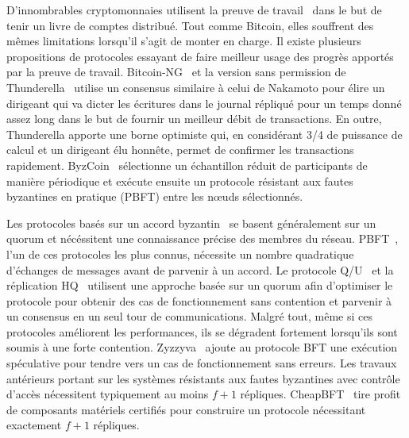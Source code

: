 {D'innombrables cryptomonnaies utilisent la preuve de travail~\cite{DworkN92, aspnes2005exposing} dans le but de tenir
un livre de comptes distribué. Tout comme Bitcoin, elles souffrent des mêmes limitations lorsqu'il s'agit de monter en
charge. Il existe plusieurs propositions de protocoles essayant de faire meilleur usage des progrès apportés par la
preuve de travail. Bitcoin-NG~\cite{EyalGSR16} et la version sans permission de Thunderella~\cite{PassS18} utilise
un consensus similaire à celui de Nakamoto pour élire un dirigeant qui va dicter les écritures dans le journal répliqué
pour un temps donné assez long dans le but de fournir un meilleur débit de transactions. En outre, Thunderella apporte
une borne optimiste qui, en considérant 3/4 de puissance de calcul et un dirigeant élu honnête, permet de confirmer les
transactions rapidement. ByzCoin~\cite{Kokoris-KogiasJ16} sélectionne un échantillon réduit de participants de manière
périodique et exécute ensuite un protocole résistant aux fautes byzantines en pratique (PBFT) entre les nœuds
sélectionnés.


Les protocoles basés sur un accord byzantin~\cite{PeaseSL80, LamportSP82} se basent généralement sur un quorum et
nécéssitent une connaissance précise des membres du réseau. PBFT~\cite{castro1999practical, CL02}, l'un de ces
protocoles les plus connus, nécessite un nombre quadratique d'échanges de messages avant de parvenir à un accord.
Le protocole Q/U~\cite{abd2005fault} et la réplication HQ~\cite{cowling2006hq} utilisent une approche basée sur un
quorum afin d'optimiser le protocole pour obtenir des cas de fonctionnement sans contention et parvenir à un consensus
en un seul tour de communications. Malgré tout, même si ces protocoles améliorent les performances, ils se dégradent
fortement lorsqu'ils sont soumis à une forte contention. Zyzzyva~\cite{KotlaADCW09} ajoute au protocole BFT une
exécution spéculative pour tendre vers un cas de fonctionnement sans erreurs. Les travaux antérieurs portant sur les
systèmes résistants aux fautes byzantines avec contrôle d'accès nécessitent typiquement au moins $f+1$ répliques.
CheapBFT~\cite{kapitza2012cheapbft} tire profit de composants matériels certifiés pour construire un protocole
nécessitant exactement $f+1$ répliques.

}
